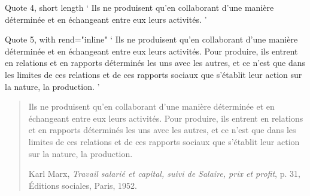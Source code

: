 \documentclass[11pt,twoside]{article}\makeatletter
\begin{document}
Quote 4, short length 	  ‘ 	    Ils ne produisent qu’en collaborant d’une manière déterminée et en échangeant entre eux leurs activités. 	  ’ 	\par
Quote 5, with rend="inline" 	  ‘ 	    Ils ne produisent qu’en collaborant d’une manière déterminée et en échangeant entre eux leurs activités. 	    Pour produire, ils entrent en relations et en rapports déterminés les uns avec les autres, 	    et ce n’est que dans les limites de ces relations et de ces rapports sociaux 	    que s’établit leur action sur la nature, la production. 	  ’ 	
\begin{quote}
\par
Ils ne produisent qu’en collaborant d’une manière déterminée et en échangeant entre eux leurs activités. 	    Pour produire, ils entrent en relations et en rapports déterminés les uns avec les autres, 	    et ce n’est que dans les limites de ces relations et de ces rapports sociaux 	    que s’établit leur action sur la nature, la production.\par
Karl Marx, 	    \textit{Travail salarié et capital, suivi de Salaire, prix et profit}, 	    p. 31, 	    Éditions sociales, 	    Paris, 	    1952.
\end{quote}
\end{document}
